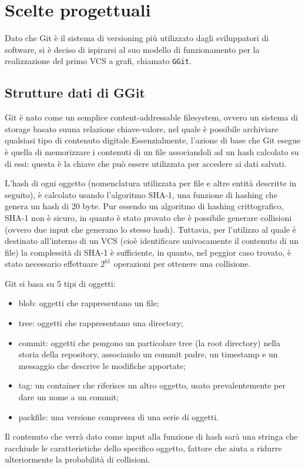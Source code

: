 \chapter{Scelte progettuali}
\label{chap:scelte_progettuali}
Dato che Git è il sistema di versioning più utilizzato dagli sviluppatori di software\cite{gitmostused}, si è deciso di ispirarsi al suo modello di funzionamento per la realizzazione del primo VCS a grafi, chiamato \texttt{GGit}.
\section{Strutture dati di GGit}
\label{sec:strutture_dati}
Git è nato come un semplice content-addressable filesystem, ovvero un sistema di storage basato suuna relazione chiave-valore, nel quale è possibile archiviare qualsiasi tipo di contenuto digitale.Essenzialmente, l'azione di base che Git esegue è quella di memorizzare i contenuti di un file associandoli ad un hash calcolato su di essi: questa è la chiave che può essere utilizzata per accedere ai dati salvati.

L'hash di ogni oggetto (nomenclatura utilizzata per file e altre entità descritte in seguito), è calcolato usando l'algoritmo SHA-1, una funzione di hashing che genera un hash di 20 byte.
Pur essendo un algoritmo di hashing crittografico, SHA-1 non è sicuro, in quanto è stato provato che è possibile generare collisioni\cite{sha1collision} (ovvero due input che generano lo stesso hash).
Tuttavia, per l'utilizzo al quale è destinato all'interno di un VCS (cioè identificare univocamente il contenuto di un file) la complessità di SHA-1 è sufficiente, in quanto, nel peggior caso trovato, è stato necessario effettuare $2^{61}$ operazioni per ottenere una collisione\cite{collisionprob}.

Git si basa su 5 tipi di oggetti:
\begin{itemize}
    \item blob: oggetti che rappresentano un file;
    \item tree: oggetti che rappresentano una directory;
    \item commit: oggetti che pongono un particolare tree (la root directory) nella storia della repository, associando un commit padre, un timestamp e un messaggio che descrive le modifiche apportate;
    \item tag: un container che riferisce un altro oggetto, usato prevalentemente per dare un nome a un commit;
    \item packfile: una versione compressa di una serie di oggetti.
\end{itemize}
Il contenuto che verrà dato come input alla funzione di hash sarà una stringa che racchiude le caratteristiche dello specifico oggetto, fattore che aiuta a ridurre ulteriormente la probabilità di collisioni.

